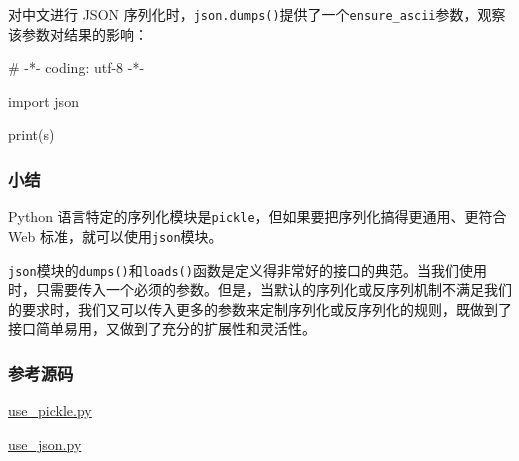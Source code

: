 对中文进行 JSON
序列化时，\texttt{json.dumps()}提供了一个\texttt{ensure\_ascii}参数，观察该参数对结果的影响：

\begin{pythoncode}
# -*- coding: utf-8 -*-

import json
\end{pythoncode}

\begin{pythoncode}
print(s)
\end{pythoncode}

\hypertarget{ux5c0fux7ed3}{%
\subsubsection{小结}\label{ux5c0fux7ed3}}

Python
语言特定的序列化模块是\texttt{pickle}，但如果要把序列化搞得更通用、更符合
Web 标准，就可以使用\texttt{json}模块。

\texttt{json}模块的\texttt{dumps()}和\texttt{loads()}函数是定义得非常好的接口的典范。当我们使用时，只需要传入一个必须的参数。但是，当默认的序列化或反序列机制不满足我们的要求时，我们又可以传入更多的参数来定制序列化或反序列化的规则，既做到了接口简单易用，又做到了充分的扩展性和灵活性。

\hypertarget{ux53c2ux8003ux6e90ux7801}{%
\subsubsection{参考源码}\label{ux53c2ux8003ux6e90ux7801}}

\href{https://github.com/michaelliao/learn-python3/blob/master/samples/io/use_pickle.py}{use\_pickle.py}

\href{https://github.com/michaelliao/learn-python3/blob/master/samples/io/use_json.py}{use\_json.py}

